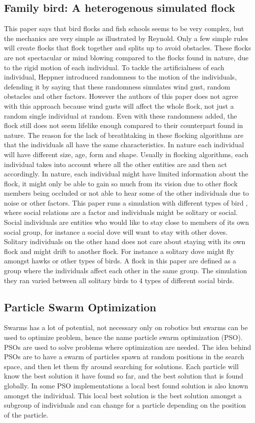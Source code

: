 \subsection{Family bird: A heterogenous simulated flock}
This paper says that bird flocks and fish schools seems to be very complex, but the mechanics are very simple as illustrated by Reynold. Only a few simple rules will create flocks that flock together and splits up to avoid obstacles. These flocks are not spectacular or mind blowing compared to the flocks found in nature, due to the rigid motion of each individual. To tackle the artificialness of each individual, Heppner introduced randomness to the motion of the individuals, defending it by saying that these randomness simulates wind gust, random obstacles and other factors. 
However the authors of this paper does not agree with this approach because wind gusts will affect the whole flock, not just a random single individual at random. Even with these randomness added, the flock still does not seem lifelike enough compared to their counterpart found in nature. The reason for the lack of breathtaking in these flocking algorithms are that the individuals all have the same characteristics. In nature each individual will have different size, age, form and shape. 
Usually in flocking algorithms, each individual takes into account where all the other entities are and then act accordingly. In nature, each individual might have limited information about the flock, it might only be able to gain so much from its vision due to other flock members being occluded or not able to hear some of the other individuals due to noise or other factors.
This paper runs a simulation with different types of bird , where social relations are a factor and individuals might be solitary or social. Social individuals are entities who would like to stay close to members of its own social group, for instance a social dove will want to stay with other doves. Solitary individuals on the other hand does not care about staying with its own flock and might drift to another flock. For instance a solitary dove might fly amongst hawks or other types of birds. A flock in this paper are defined as a group where the individuals affect each other in the same group. The simulation they ran varied between all solitary birds to 4 types of different social birds.

\subsection{Particle Swarm Optimization}
Swarms has a lot of potential, not necessary only on robotics but swarms can be used to optimize problem, hence the name particle swarm optimization (PSO). PSOs are used to solve problems where optimization are needed. The idea behind PSOs are to have a swarm of particles spawn at random positions in the search space, and then let them fly around searching for solutions. Each particle will know the best solution it have found so far, and the best solution that is found globally. In some PSO implementations a local best found solution is also known amongst the individual. This local best solution is the best solution amongst a subgroup of individuals and can change for a particle depending on the position of the particle.

